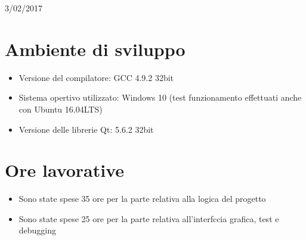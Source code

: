 \documentclass[10pt]{article}
\begin{document}
\begin{titlepage}


{\large 3/02/2017}\\[3cm] %


 

\vfill %

\end{titlepage}
\newpage
{}

\section{Ambiente di sviluppo}
\begin{itemize}
	\item Versione del compilatore: GCC 4.9.2 32bit
	\item Sistema opertivo utilizzato: Windows 10 (test funzionamento effettuati anche con Ubuntu 16.04LTS)
	\item Versione delle librerie Qt: 5.6.2 32bit
\end{itemize}
\section{Ore lavorative}
\begin{itemize}
	\item Sono state spese 35 ore per la parte relativa alla logica del progetto
	\item Sono state spese 25 ore per la parte relativa all'interfccia grafica, test e debugging
\end{itemize}
\end{document}
